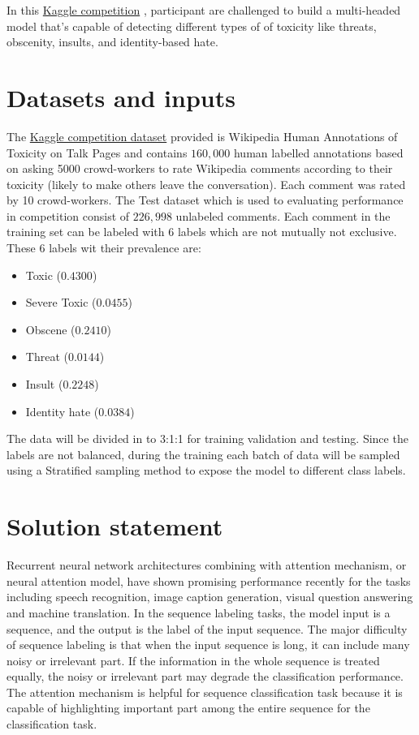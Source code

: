\documentclass{article}
\begin{document}
In this \href{https://www.kaggle.com/c/jigsaw-toxic-comment-classification-challenge}{Kaggle competition} ,  participant are challenged to build a multi-headed model that’s
capable of detecting different types of of toxicity like threats, obscenity,
insults, and identity-based hate.


\section{Datasets and inputs}

The \href{https://www.kaggle.com/c/jigsaw-toxic-comment-classification-challenge/data}{Kaggle competition dataset} provided is Wikipedia Human Annotations of Toxicity on Talk Pages and contains $160,000$ human labelled annotations based on asking 5000 crowd-workers to rate Wikipedia comments according to their toxicity (likely to make others leave the conversation). Each comment was rated by 10 crowd-workers. The Test dataset which is used to evaluating performance in competition consist of $226,998$ unlabeled comments. Each comment in the training set can be labeled with $6$ labels which are not mutually not exclusive. These 6 labels wit their prevalence are:

\begin{itemize}
        \item Toxic ($0.4300$)
        \item Severe Toxic ($0.0455$)
        \item Obscene ($0.2410$)
        \item Threat ($0.0144$)
        \item Insult ($0.2248$)
        \item Identity hate ($0.0384$)
\end{itemize}


The data will be divided in to 3:1:1 for training validation and testing. Since the labels are not balanced, during the training each batch of data will be sampled using a Stratified sampling method to expose the model to different class labels.



\section{Solution statement}

Recurrent neural network architectures combining with attention mechanism,
or neural attention model, have shown promising performance recently for
the tasks including speech recognition, image caption generation,
visual question answering and machine translation. 
In the sequence labeling tasks,
the model input is a sequence, and the output is the label of the
input sequence. The major difficulty of sequence labeling is that when
the input sequence is long, it can include many noisy or irrelevant part.
If the information in the whole sequence is treated equally, the noisy or
irrelevant part may degrade the classification performance.
The attention mechanism is helpful for sequence classification task because
it is capable of highlighting important part among the entire sequence for
the classification task.
\end{document}
